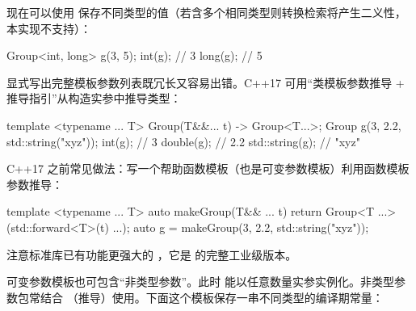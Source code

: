 现在可以使用  保存不同类型的值（若含多个相同类型则转换检索将产生二义性，本实现不支持）：

\begin{code}
Group<int, long> g(3, 5);
int(g);    // 3
long(g);    // 5
\end{code}

显式写出完整模板参数列表既冗长又容易出错。C++17 可用“类模板参数推导 + 推导指引”从构造实参中推导类型：

\begin{code}
template <typename ... T> Group(T&&... t) -> Group<T...>;
Group g(3, 2.2, std::string("xyz"));
int(g);            // 3
double(g);            // 2.2
std::string(g);        // "xyz"
\end{code}

C++17 之前常见做法：写一个帮助函数模板（也是可变参数模板）利用函数模板参数推导：

\begin{code}
template <typename ... T> auto makeGroup(T&& ... t) {
  return Group<T ...>(std::forward<T>(t) ...);
}
auto g = makeGroup(3, 2.2, std::string("xyz"));
\end{code}

注意标准库已有功能更强大的 ，它是  的完整工业级版本。

可变参数模板也可包含“非类型参数”。此时  能以任意数量实参实例化。非类型参数包常结合 （推导）使用。下面这个模板保存一串不同类型的编译期常量：

